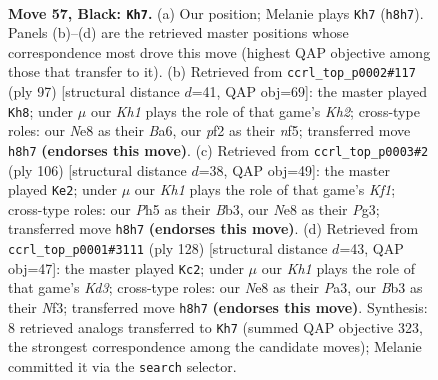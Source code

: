 \documentclass[11pt]{article}
\begin{document}
\clearpage

\begin{figure}[p]\centering
\begin{subfigure}{0.46\textwidth}\centering
\resizebox{\linewidth}{!}{%
\newchessgame
\chessboard[
  setfen={4nQ1k/8/p3P3/3P3p/6pq/Nb6/5P2/5KN1 b - - 4 57},
  showmover=false,
  pgfstyle=straightmove, color=movearrow, markmove={h8-h7}
]}
\caption{}
\end{subfigure}\hfill
\begin{subfigure}{0.46\textwidth}\centering
\resizebox{\linewidth}{!}{%
\newchessgame
\chessboard[
  setfen={8/5Q1k/b6p/5Nq1/4P1P1/7K/3p3P/8 b - - 4 49},
  showmover=false,
  pgfstyle=straightmove, color=movearrow, markmove={h7-h8}
]}
\caption{}
\end{subfigure}
\\[4pt]
\begin{subfigure}{0.46\textwidth}\centering
\resizebox{\linewidth}{!}{%
\newchessgame
\chessboard[
  setfen={7k/6pn/p3Q2p/1p6/1P6/PB4PP/8/2q2K2 w - - 13 54},
  showmover=false,
  pgfstyle=straightmove, color=movearrow, markmove={f1-e2}
]}
\caption{}
\end{subfigure}\hfill
\begin{subfigure}{0.46\textwidth}\centering
\resizebox{\linewidth}{!}{%
\newchessgame
\chessboard[
  setfen={6k1/1p6/p1nq2p1/8/4Q2P/P1PK1N2/8/8 w - - 5 65},
  showmover=false,
  pgfstyle=straightmove, color=movearrow, markmove={d3-c2}
]}
\caption{}
\end{subfigure}
\caption{\textbf{Move 57, Black: \texttt{Kh7}.} (a) Our position; Melanie plays \texttt{Kh7} (\texttt{h8h7}). Panels (b)--(d) are the retrieved master positions whose correspondence most drove this move (highest QAP objective among those that transfer to it). (b) Retrieved from \texttt{ccrl\_top\_p0002\#117} (ply 97) [structural distance $d$=41, QAP obj=69]: the master played \texttt{Kh8}; under $\mu$ our \emph{Kh1} plays the role of that game's \emph{Kh2}; cross-type roles: our \emph{N}e8 as their \emph{B}a6, our \emph{p}f2 as their \emph{n}f5; transferred move \texttt{h8h7} \textbf{(endorses this move)}. (c) Retrieved from \texttt{ccrl\_top\_p0003\#2} (ply 106) [structural distance $d$=38, QAP obj=49]: the master played \texttt{Ke2}; under $\mu$ our \emph{Kh1} plays the role of that game's \emph{Kf1}; cross-type roles: our \emph{P}h5 as their \emph{B}b3, our \emph{N}e8 as their \emph{P}g3; transferred move \texttt{h8h7} \textbf{(endorses this move)}. (d) Retrieved from \texttt{ccrl\_top\_p0001\#3111} (ply 128) [structural distance $d$=43, QAP obj=47]: the master played \texttt{Kc2}; under $\mu$ our \emph{Kh1} plays the role of that game's \emph{Kd3}; cross-type roles: our \emph{N}e8 as their \emph{P}a3, our \emph{B}b3 as their \emph{N}f3; transferred move \texttt{h8h7} \textbf{(endorses this move)}. Synthesis: 8 retrieved analogs transferred to \texttt{Kh7} (summed QAP objective 323, the strongest correspondence among the candidate moves); Melanie committed it via the \texttt{search} selector.}
\label{fig:thought-m113}
\end{figure}
\end{document}
